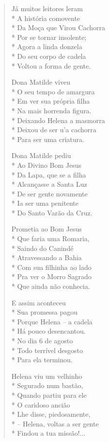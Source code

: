 \begin{verse}
Já muitos leitores leram\\*
A história comovente\\*
Da Moça que Virou Cachorra\\*
Por se tornar insolente;\\*
Agora a linda donzela\\*
Do seu corpo de cadela\\*
Voltou a forma de gente.

Dona Matilde viveu\\*
O seu tempo de amargura\\*
Em ver sua própria filha\\*
Na mais horrenda figura.\\*
Deixando Helena a masmorra\\*
Deixou de ser u'a cachorra\\*
Para ser uma criatura.

Dona Matilde pediu\\*
Ao Divino Bom Jesus\\*
Da Lapa, que se a filha\\*
Alcançasse a Santa Luz\\*
De ser gente novamente\\*
Ia ser uma penitente\\*
Do Santo Varão da Cruz.

Prometia ao Bom Jesus\\*
Que faria uma Romaria,\\*
Saindo do Canindé\\*
Atravessando a Bahia\\*
Com sua filhinha ao lado\\*
Pra ver o Morro Sagrado\\*
Que ainda não conhecia.

E assim aconteceu\\*
Sua promessa pagou\\*
Porque Helena -- a cadela\\*
Há pouco desencantou.\\*
No dia 6 de agosto\\*
Todo terrível desgosto\\*
Para ela terminou.

Helena viu um velhinho\\*
Segurado num bastão,\\*
Quando partiu para ele\\*
O caridoso ancião\\*
Lhe disse, piedosamente,\\*
-- Helena, voltas a ser gente\\*
Findou a tua missão!...


\end{verse}
